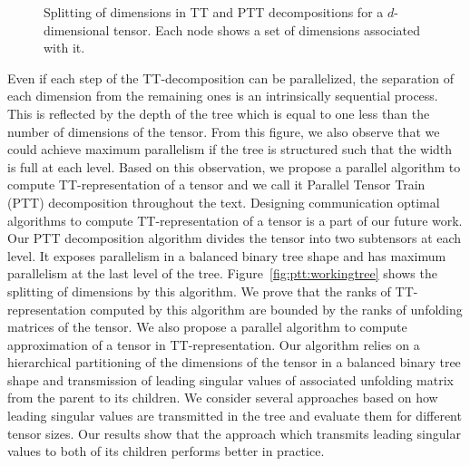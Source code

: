 \documentclass[sigconf]{acmart}
\begin{document}
\begin{figure*}[!t]
\begin{center}
{
		}
		\caption{Splitting of dimensions in TT and PTT decompositions for a $d$-dimensional tensor. Each node shows a set of dimensions associated with it.~\label{fig:tt:ptt}}
	\end{center}
\end{figure*} 
Even if each step of the TT-decomposition can be parallelized, the separation of each dimension from the remaining ones is an intrinsically sequential process. This is reflected by the depth of the tree which is equal to one less than the number of dimensions of the tensor. From this figure, we also observe that we could achieve maximum parallelism if the tree is structured such that the width is full at each level. Based on this observation, we propose a parallel algorithm to compute TT-representation of a tensor and we call it Parallel Tensor Train (PTT) decomposition throughout the text. Designing communication optimal algorithms to compute TT-representation of a tensor is a part of our future work. Our PTT decomposition algorithm divides the tensor into two subtensors at each level. It exposes parallelism in a balanced binary tree shape and has maximum parallelism at the last level of the tree. Figure~\ref{fig:ptt:workingtree} shows the splitting of dimensions by this algorithm. We prove that the ranks of TT-representation computed by this algorithm are bounded by the ranks of unfolding matrices of the tensor. We also propose a parallel algorithm to compute approximation of a tensor in TT-representation. Our algorithm relies on a hierarchical partitioning of the dimensions of the tensor in a balanced binary tree shape and transmission of leading singular values of associated unfolding matrix from the parent to its children. We consider several approaches based on how leading singular values are transmitted in the tree and  evaluate them for different tensor sizes. Our results show that the approach which transmits leading singular values to both of its children performs better in practice.

\end{document}
